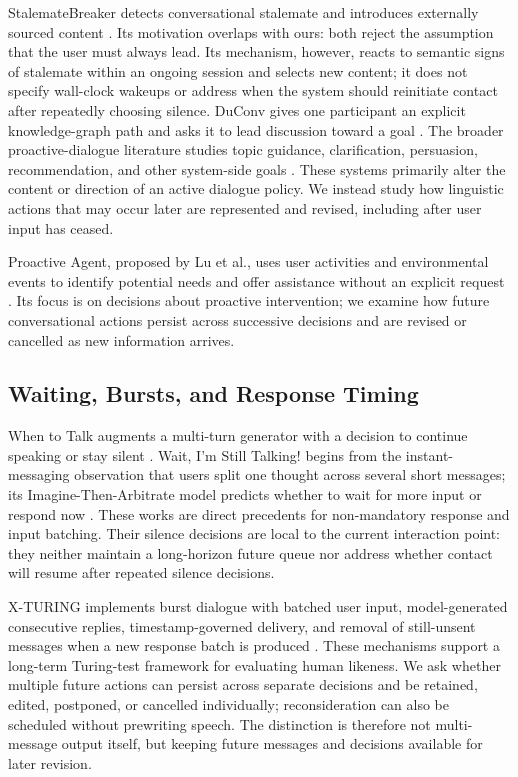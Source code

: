 \documentclass[manuscript,nonacm]{acmart}
\begin{document}
StalemateBreaker detects conversational stalemate and introduces externally
sourced content \cite{li2016stalemate}. Its motivation overlaps with ours: both
reject the assumption that the user must always lead. Its mechanism, however,
reacts to semantic signs of stalemate within an ongoing session and selects new
content; it does not specify wall-clock wakeups or address when the system should
reinitiate contact after repeatedly choosing silence. DuConv gives one participant
an explicit knowledge-graph path and asks it to lead discussion toward a goal
\cite{wu2019duconv}.
The broader proactive-dialogue literature studies topic guidance, clarification,
persuasion, recommendation, and other system-side goals \cite{deng2023survey}.
These systems primarily alter the content or direction of an active dialogue
policy. We instead study how linguistic actions that may occur later are
represented and revised, including after user input has ceased.

Proactive Agent, proposed by Lu et al., uses user activities and environmental
events to identify potential needs and offer assistance without an explicit
request \cite{lu2025proactive}. Its focus is on decisions about proactive
intervention; we examine how future conversational actions persist across
successive decisions and are revised or cancelled as new information arrives.

\subsection{Waiting, Bursts, and Response Timing}

When to Talk augments a multi-turn generator with a decision to continue speaking
or stay silent \cite{lan2019when}. Wait, I'm Still Talking! begins from the
instant-messaging observation that users split one thought across several short
messages; its Imagine-Then-Arbitrate model predicts whether to wait for more
input or respond now \cite{lin2020wait}. These works are direct precedents for
non-mandatory response and input batching. Their silence decisions are local to
the current interaction point: they neither maintain a long-horizon future queue
nor address whether contact will resume after repeated silence decisions.

X-TURING implements burst dialogue with batched user input, model-generated
consecutive replies, timestamp-governed delivery, and removal of still-unsent
messages when a new response batch is produced \cite{wu2025xturing}. These
mechanisms support a long-term Turing-test framework for evaluating human
likeness. We ask whether multiple future actions can persist across separate
decisions and be retained, edited, postponed, or cancelled individually; reconsideration
can also be scheduled without prewriting speech. The distinction is therefore
not multi-message output itself, but keeping future messages and decisions
available for later revision.
\end{document}
